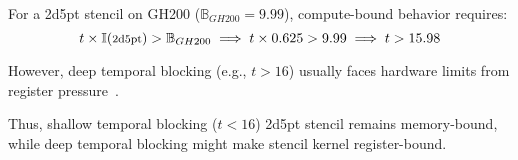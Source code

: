 For a 2d5pt stencil on GH200 ($\mathbb{B}_{GH200}=9.99$), compute-bound behavior requires:
\begin{equation}\footnotesize
t\times \mathbb{I}(\text{2d5pt})>\mathbb{B}_{GH200} \implies t\times 0.625 > 9.99 \implies t > 15.98
\end{equation}

However, deep temporal blocking (e.g., $t > 16$) usually faces hardware limits from register pressure~\cite{10.1145/3577193.3593716,10.1145/3368826.3377904}. 

Thus, shallow temporal blocking ($t < 16$) 2d5pt stencil remains memory-bound, while deep temporal blocking might make stencil kernel register-bound. 





